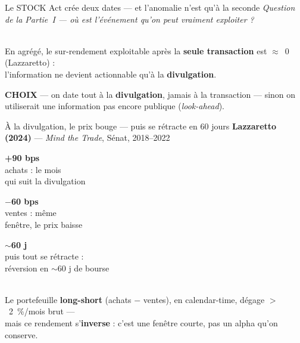 \documentclass[11pt,aspectratio=169]{beamer}
\newcommand{\tuile}[3]{%
  \begin{minipage}[t]{0.23\textwidth}\centering
    \colorbox{#1}{\parbox[c][21mm][c]{\dimexpr\linewidth-8pt}{\centering
      {\color{white}\Large\textbf{#2}}\\[0.6mm]
      {\color{white}\footnotesize #3}}}
  \end{minipage}}
\newcommand{\choixbox}[1]{%
  \colorbox{alertred!8}{\parbox{\dimexpr\linewidth-8pt}{\scriptsize
    \textbf{\textcolor{alertred}{CHOIX}}\; --- #1}}}
\begin{document}
\begin{frame}{Le STOCK Act crée deux dates --- et l'anomalie n'est qu'à la seconde}
  \centering
  \vspace{0.5mm}
  {\footnotesize\textit{Question de la Partie~I --- où est l'événement qu'on peut vraiment exploiter ?}}\\[5mm]
  \\[5mm]
  {\footnotesize En agrégé, le sur-rendement exploitable après la \textbf{seule transaction} est $\approx$~0
   (Lazzaretto) :\\ l'information ne devient actionnable qu'à la \textbf{divulgation}.}\\[3.5mm]
  \choixbox{on date tout à la \textbf{divulgation}, jamais à la transaction --- sinon on utiliserait
   une information pas encore publique (\emph{look-ahead}).}
\end{frame}

\begin{frame}{À la divulgation, le prix bouge --- puis se rétracte en 60 jours}
  \centering
  {\footnotesize\textbf{Lazzaretto (2024)} --- \emph{Mind the Trade}, Sénat, 2018--2022}\\[4mm]
  \tuile{helec}{+90 bps}{achats : le mois\\qui suit la divulgation}\hfill
  \tuile{alertred}{$-$60 bps}{ventes : même\\fenêtre, le prix baisse}\hfill
  \tuile{warnorange}{$\sim$60 j}{puis tout se rétracte :\\réversion en $\sim$60 j de bourse}\\[5mm]
  {\footnotesize Le portefeuille \textbf{long-short} (achats $-$ ventes), en calendar-time, dégage
   $>$~2~\%/mois brut ---\\ mais ce rendement s'\textbf{inverse} : c'est une fenêtre courte, pas un alpha qu'on conserve.}
\end{frame}
\end{document}
